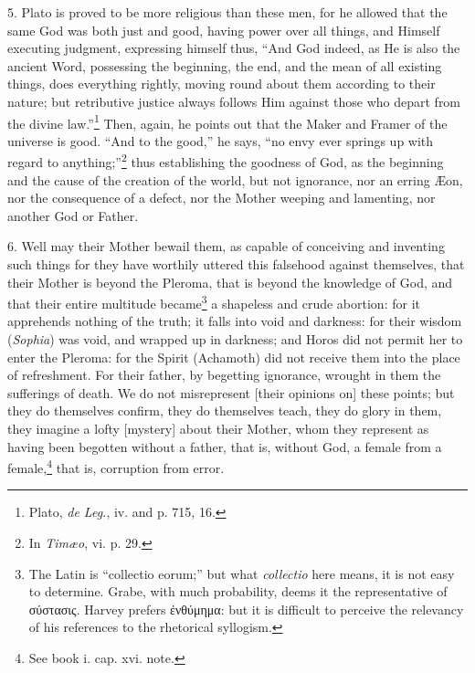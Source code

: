 5. Plato is proved to be more religious than these men, for he allowed that the same God was both just and good, having power over all things, and Himself executing judgment, expressing himself thus, “And God indeed, as He is also the ancient Word, possessing the beginning, the end, and the mean of all existing things, does everything rightly, moving round about them according to their nature; but retributive justice always follows Him against those who depart from the divine law.”\footnote{Plato, \emph{de Leg.}, iv. and p. 715, 16.} Then, again, he points out that the Maker and Framer of the universe is good. “And to the good,” he says, “no envy ever springs up with regard to anything;”\footnote{In \emph{Timæo}, vi. p. 29.} thus establishing the goodness of God, as the beginning and the cause of the creation of the world, but not ignorance, nor an erring Æon, nor the  consequence of a defect, nor the Mother weeping and lamenting, nor another God or Father.

6. Well may their Mother bewail them, as capable of conceiving and inventing such things for they have worthily uttered this falsehood against themselves, that their Mother is beyond the Pleroma, that is beyond the knowledge of God, and that their entire multitude became\footnote{The Latin is “collectio eorum;” but what \emph{collectio} here means, it is not easy to determine. Grabe, with much probability, deems it the representative of \textgreek{σύστασις}. Harvey prefers \textgreek{ἐνθύμημα}: but it is difficult to perceive the relevancy of his references to the rhetorical syllogism.} a shapeless and crude abortion: for it apprehends nothing of the truth; it falls into void and darkness: for their wisdom (\emph{Sophia}) was void, and wrapped up in darkness; and Horos did not permit her to enter the Pleroma: for the Spirit (Achamoth) did not receive them into the place of refreshment. For their father, by begetting ignorance, wrought in them the sufferings of death. We do not misrepresent [their opinions on] these points; but they do themselves confirm, they do themselves teach, they do glory in them, they imagine a lofty [mystery] about their Mother, whom they represent as having been begotten without a father, that is, without God, a female from a female,\footnote{See book i. cap. xvi. note.} that is, corruption from error.

